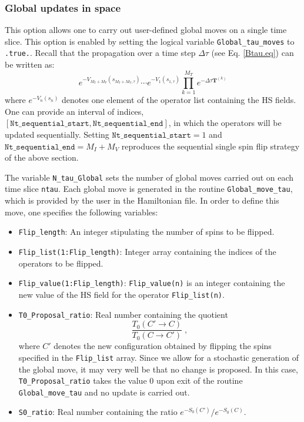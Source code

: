 \subsubsection{Global updates in space} 
\label{sec:global_space}
This option allows one to carry out  user-defined global moves on a single time slice.  This option is enabled by setting the logical variable  \texttt{Global\_tau\_moves} to \texttt{.true.}.  Recall that the propagation over a time step $\Delta \tau$   (see Eq. \ref{Btau.eq}) can be  written as: 
\begin{equation}
	e^{-V_{M_I+M_V}(s_{M_I+M_V,\tau})}  \cdots e^{-V_{1}(s_{1,\tau})}  \prod_{k=1}^{M_T}   e^{-\Delta \tau {\bm T}^{(k)}}  
\end{equation}
where $e^{-V_{n}(s_{n})}$ denotes one element of the  operator list  containing the HS fields.  One can provide  an interval of indices, 
$ \left[ \texttt{Nt\_sequential\_start}, 
\texttt{Nt\_sequential\_end} \right] $,  in which the operators will be updated  sequentially. Setting $ \texttt{Nt\_sequential\_start} =1 $ and 
$ \texttt{Nt\_sequential\_end} = M_I+M_V$  reproduces the  sequential single spin flip strategy of the above section.

The variable \texttt{N\_tau\_Global}  sets the number of global moves carried out on each time slice \texttt{ntau}. Each global move is generated in the routine  \texttt{Global\_move\_tau}, which is provided by the user in the Hamiltonian file. In order to  define this move, one specifies the following variables: 
\begin{itemize}
\item \texttt{Flip\_length}:  An integer stipulating the  number of spins to be flipped.
\item \texttt{Flip\_list(1:Flip\_length)}:   Integer array containing the  indices of the operators to be flipped.
\item \texttt{Flip\_value(1:Flip\_length)}:  \texttt{Flip\_value(n)} is an  integer containing the new value of the  HS  field for the operator \texttt{Flip\_list(n)}.
\item  \texttt{T0\_Proposal\_ratio}:   Real number containing  the quotient
\begin{equation}
	 \frac{T_0(C' \rightarrow C)}{T_0(C \rightarrow C') }  \;, \label{T0_ratio}
\end{equation}
where $ C'$  denotes the new configuration  obtained by flipping the spins specified in the \texttt{Flip\_list}  array. 
Since we allow for a stochastic  generation of  the global move, it may very well be that no change is proposed. In this case, \texttt{T0\_Proposal\_ratio}   takes the value 0 upon exit of the routine \texttt{Global\_move\_tau} and  no update is carried out. 
\item \texttt{S0\_ratio}:   Real number containing  the ratio  $e^{-S_0(C')}/e^{-S_0(C)}$. 
\end{itemize}
